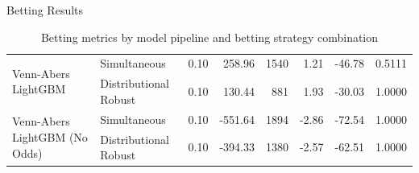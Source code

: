 \documentclass[final]{beamer}
\newlength{\colwidth}
\begin{document}
\begin{frame}[t]
\begin{columns}[t]
\begin{column}{\colwidth}
\begin{block}{Betting Results}
\begin{table}[]
\begin{tabular}{@{}llrrrrrr@{}}
    \multirow{2}{*}{Venn-Abers LightGBM}                      & Simultaneous                  & 0.10     & 258.96      & 1540       & 1.21       & -46.78            & 0.5111                  \\
                                                              & Distributional Robust       & 0.10     & 130.44      & 881        & 1.93       & -30.03            & 1.0000                  \\
    \multirow{2}{*}{Venn-Abers LightGBM (No Odds)}            & Simultaneous                 & 0.10     & -551.64     & 1894       & -2.86      & -72.54            & 1.0000                  \\
                                                              & Distributional Robust        & 0.10     & -394.33     & 1380      & -2.57      & -62.51            & 1.0000                  \\ \bottomrule
    \end{tabular}
    \caption{Betting metrics by model pipeline and betting strategy combination}
    \end{table}
    \normalsize
    

\end{block}
\end{column}
\end{columns}
\end{frame}
\end{document}
